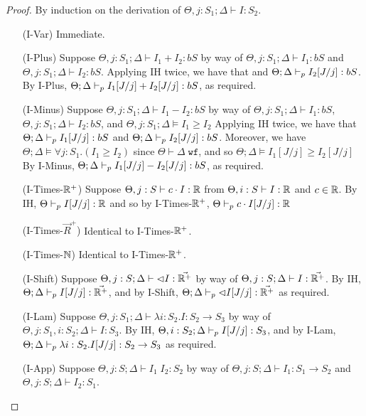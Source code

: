 \begin{proof}
By induction on the derivation of $\Theta, j : S_1 ; \Delta \vdash I : S_2$.
\begin{itemize}
  \item[(I-Var)] Immediate.
  \item[(I-Plus)] Suppose $\Theta, j : S_1 ; \Delta \vdash I_1 + I_2 : bS$ by way of
  $\Theta, j : S_1 ; \Delta \vdash I_1: bS$ and
  $\Theta, j : S_1 ; \Delta \vdash I_2 : bS$.
  Applying IH twice, we have that
   and
  $\Theta ; \Delta \vdash_p I_2[J/j] : bS$.
  By I-Plus, $\Theta ; \Delta \vdash_p I_1[J/j] + I_2[J/j]: bS$, as required.
  \item[(I-Minus)] Suppose $\Theta, j : S_1 ; \Delta \vdash I_1 - I_2 : bS$ by way of
  $\Theta, j : S_1 ; \Delta \vdash I_1: bS$,
  $\Theta, j : S_1 ; \Delta \vdash I_2 : bS$, and
  $\Theta, j : S_1 ; \Delta \vDash I_1 \geq I_2$
  Applying IH twice, we have that
  $\Theta ; \Delta \vdash_p I_1[J/j] : bS$ and
  $\Theta ; \Delta \vdash_p I_2[J/j] : bS$.
  Moreover, we have $\Theta ; \Delta \vDash \forall j : S_1. (I_1 \geq I_2)$ since $\Theta \vdash \Delta \; \texttt{wf}$, and so
  $\Theta ; \Delta \vDash I_1[J/j] \geq I_2[J/j]$
  By I-Minus, $\Theta ; \Delta \vdash_p I_1[J/j] - I_2[J/j]: bS$, as required.
  \item[(I-Times-$\mathbb{R}^+$)] Suppose $\Theta , j : S \vdash c \cdot I : \mathbb{R}$ from
  $\Theta, i : S \vdash I : \mathbb{R}$ and
  $c \in \mathbb{R}$.
  By IH,
  $\Theta \vdash_p I[J/j] : \mathbb{R}$
  and so by I-Times-$\mathbb{R}^+$,
  $\Theta \vdash_p c \cdot I[J/j] : \mathbb{R}$
  \item[(I-Times-$\vec{R}^+$)] Identical to I-Times-$\mathbb{R}^+$.
  \item[(I-Times-$\mathbb{N}$)] Identical to I-Times-$\mathbb{R}^+$.
  \item[(I-Shift)] Suppose $\Theta, j : S ; \Delta \vdash \lhd I : \vec{\mathbb{R}^+}$ by way of $\Theta, j : S ; \Delta \vdash I : \vec{\mathbb{R}^+}$.
  By IH,
  $\Theta ; \Delta \vdash_p I[J/j] : \vec{\mathbb{R}^+}$,
  and by I-Shift,
  $\Theta ; \Delta \vdash_p \lhd I[J/j] : \vec{\mathbb{R}^+}$
  as required.
  \item[(I-Lam)] Suppose $\Theta, j : S_1 ; \Delta \vdash \lambda i : S_2. I : S_2 \to S_3$ by way of
  $\Theta, j : S_1, i : S_2 ; \Delta \vdash I : S_3$.
  By IH,
  $\Theta, i : S_2 ; \Delta \vdash_p I[J/j] : S_3$,
  and by I-Lam,
  $\Theta ; \Delta \vdash_p \lambda i : S_2. I[J/j] : S_2 \to S_3$ as required.
  \item[(I-App)] Suppose $\Theta, j : S ; \Delta \vdash I_1 \; I_2 : S_2$ by way of
  $\Theta, j : S; \Delta \vdash I_1 : S_1 \to S_2$ and
  $\Theta, j : S; \Delta \vdash I_2 : S_1$.

\end{itemize}
\end{proof}
